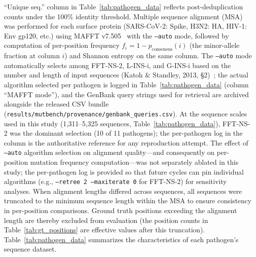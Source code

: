 ``Unique seq.'' column in Table~\ref{tab:pathogen_data} reflects post-deduplication counts under the 100\% identity threshold. Multiple sequence alignment (MSA) was performed for each surface protein (SARS-CoV-2: Spike, H3N2: HA, HIV-1: Env gp120, etc.) using MAFFT v7.505~\cite{katoh2013mafft} with the \texttt{--auto} mode, followed by computation of per-position frequency $f_i = 1 - p_{\text{consensus}}(i)$ (the minor-allele fraction at column $i$) and Shannon entropy on the same column.
The \texttt{--auto} mode automatically selects among FFT-NS-2, L-INS-i, and G-INS-i based on the number and length of input sequences (Katoh \& Standley, 2013, \S2)~\cite{katoh2013mafft}; the actual algorithm selected per pathogen is logged in Table~\ref{tab:pathogen_data} (column ``MAFFT mode''), and the GenBank query strings used for retrieval are archived alongside the released CSV bundle (\texttt{results/mutbench/provenance/genbank\_queries.csv}).
At the sequence scales used in this study (1,311--5,325 sequences, Table~\ref{tab:pathogen_data}), FFT-NS-2 was the dominant selection (10 of 11 pathogens); the per-pathogen log in the column is the authoritative reference for any reproduction attempt. The effect of \texttt{--auto} algorithm selection on alignment quality---and consequently on per-position mutation frequency computation---was not separately ablated in this study; the per-pathogen log is provided so that future cycles can pin individual algorithms (e.g., \texttt{--retree 2 --maxiterate 0} for FFT-NS-2) for sensitivity analyses.
When alignment lengths differed across sequences, all sequences were truncated to the minimum sequence length within the MSA to ensure consistency in per-position comparisons.
Ground truth positions exceeding the alignment length are thereby excluded from evaluation (the position counts in Table~\ref{tab:gt_positions} are effective values after this truncation).
Table~\ref{tab:pathogen_data} summarizes the characteristics of each pathogen's sequence dataset.

